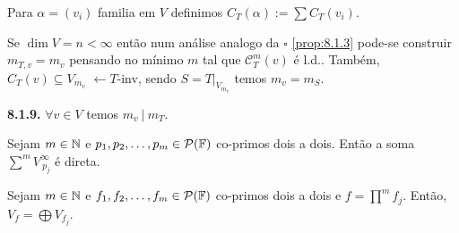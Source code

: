      
\begin{definition}
    Para \(\alpha = (v_i)\) familia em \(V\) definimos \(C_T(\alpha):= \sum C_T(v_i)\).  
\end{definition}


\begin{note}
    Se \(\dim V = n < \infty\) então num análise analogo da \(\square\) \ref{prop:8.1.3} pode-se construir \(m_{T,v}= m_v\) pensando no mínimo \(m\) tal que \(\mathscr{C}^m_T(v)\) é l.d.. Também, \(C_T(v)\subseteq V_{m_v}\) \(\leftarrow T\)-inv, sendo \(S = T|_{V_{m_v}}\) temos \(m_v = m_S\). 
\end{note}

\begin{corollary}
    \textbf{8.1.9.} \(\forall v \in V\) temos \(m_v \ | \ m_T\). 
\end{corollary}

\begin{proposition}
    \label{prop:8.1.11}
    Sejam \(m \in \mathbb{N}\) e \(p_1, p_2, \ldots, p_m\in \mathcal{P}(\mathbb{F}) \) co-primos dois a dois. Então a soma \(\sum^m V_{\ p_j}^\infty\) é direta.
\end{proposition}


\begin{proposition}
    \label{prop:8.1.12}
    Sejam \(m \in \mathbb{N}\) e \(f_1, f_2, \ldots, f_m \in \mathcal{P}(\mathbb{F})\) co-primos dois a dois e \(f = \prod^m f_j\). Então, \(V_f = \bigoplus V_{f_j}\). 
\end{proposition}

